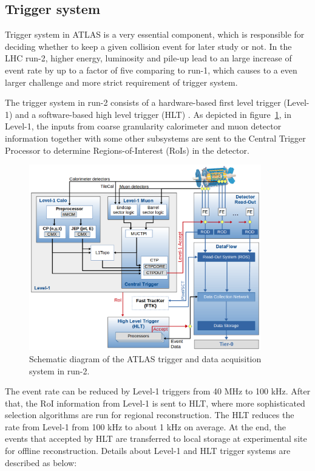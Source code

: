 \subsection{Trigger system}

Trigger system in ATLAS is a very essential component, which is responsible for deciding whether to keep a given collision event for later study or not.
In the LHC run-2, higher energy, luminosity and pile-up lead to an large increase of event rate by up to a factor of five comparing to run-1, which causes to a even larger challenge and more strict requirement of trigger system.

The trigger system in run-2 consists of a hardware-based first level trigger (Level-1) and a software-based high level trigger (HLT) \cite{Ruiz-Martinez:2133909}.
As depicted in figure~\ref{fig:trig_syst}, in Level-1, the inputs from coarse granularity calorimeter and muon detector information together with some other subsystems are sent to the Central Trigger Processor to determine Regions-of-Interest (RoIs) in the detector. 
\begin{figure}[!htb]
  \centering
  \includegraphics[width=0.9\textwidth]{figures/Detector/tdaq-run2-schematic2017.png}
  \caption{Schematic diagram of the ATLAS trigger and data acquisition system in run-2.}
  \label{fig:trig_syst}
\end{figure}
The event rate can be reduced by Level-1 triggers from 40 MHz to 100 kHz. 
After that, the RoI information from Level-1 is sent to HLT, where more sophisticated selection algorithms are run for regional reconstruction.
The HLT reduces the rate from Level-1 from 100 kHz to about 1 kHz on average.
At the end, the events that accepted by HLT are transferred to local storage at experimental site for offline reconstruction.
Details about Level-1 and HLT trigger systems are described as below:

